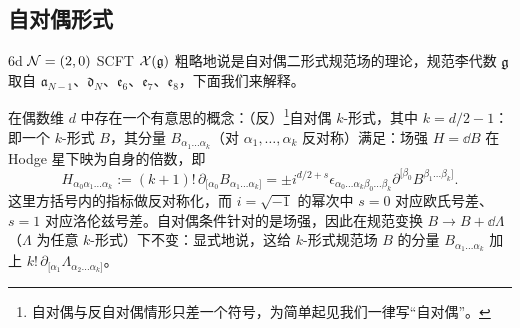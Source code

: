 \subsection{自对偶形式}

6d $\mathcal{N}=(2,0)$ SCFT $\mathcal{X}(\mathfrak{g})$ 粗略地说是自对偶二形式规范场的理论，规范李代数 $\mathfrak{g}$ 取自 $\mathfrak{a}_{N-1}$、$\mathfrak{d}_N$、$\mathfrak{e}_6$、$\mathfrak{e}_7$、$\mathfrak{e}_8$，下面我们来解释。

在偶数维 $d$ 中存在一个有意思的概念：（反）\footnote{自对偶与反自对偶情形只差一个符号，为简单起见我们一律写“自对偶”。}自对偶 $k$-形式，其中 $k=d/2-1$：即一个 $k$-形式 $B$，其分量 $B_{\alpha_1\dots\alpha_k}$（对 $\alpha_1,\dots,\alpha_k$ 反对称）满足：场强 $H=\dd B$ 在 Hodge 星下映为自身的倍数，即
\begin{equation}
H_{\alpha_0\alpha_1\dots\alpha_k} := (k+1)!\,\partial_{[\alpha_0}B_{\alpha_1\dots\alpha_k]} = \pm i^{d/2+s}\epsilon_{\alpha_0\dots\alpha_k\beta_0\dots\beta_k}\partial^{[\beta_0}B^{\beta_1\dots\beta_k]} .
\tag{2.1}
\end{equation}
这里方括号内的指标做反对称化，而 $i=\sqrt{-1}$ 的幂次中 $s=0$ 对应欧氏号差、$s=1$ 对应洛伦兹号差。自对偶条件针对的是场强，因此在规范变换 $B\to B+\dd\Lambda$（$\Lambda$ 为任意 $k$-形式）下不变：显式地说，这给 $k$-形式规范场 $B$ 的分量 $B_{\alpha_1\dots\alpha_k}$ 加上 $k!\,\partial_{[\alpha_1}\Lambda_{\alpha_2\dots\alpha_k]}$。




